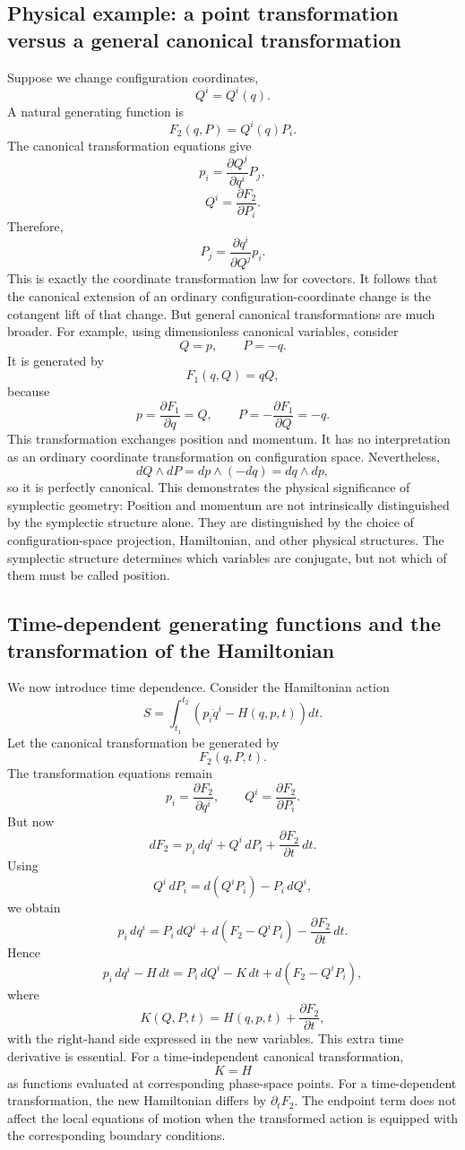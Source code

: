 \subsection{ Physical example: a point transformation versus a general
canonical transformation}
Suppose we change configuration coordinates,
\[
Q^i=Q^i(q).
\]
A natural generating function is
\[
\boxed{F_2(q,P)=Q^i(q)P_i.}
\]
The canonical transformation equations give
\[
p_i=\frac{\partial Q^j}{\partial q^i}P_j,
\]
\[
Q^i=\frac{\partial F_2}{\partial P_i}.
\]
Therefore,
\[
\boxed{
P_j=\frac{\partial q^i}{\partial Q^j}p_i.
}
\]
This is exactly the coordinate transformation law for covectors.
It follows that the canonical extension of an ordinary configuration-coordinate
change is the cotangent lift of that change.
But general canonical transformations are much broader.
For example, using dimensionless canonical variables, consider
\[
\boxed{Q=p,\qquad P=-q.}
\]
It is generated by
\[
F_1(q,Q)=qQ,
\]
because
\[
p=\frac{\partial F_1}{\partial q}=Q,
\qquad
P=-\frac{\partial F_1}{\partial Q}=-q.
\]
This transformation exchanges position and momentum.
It has no interpretation as an ordinary coordinate transformation on
configuration space.
Nevertheless,
\[
dQ\wedge dP=dp\wedge(-dq)=dq\wedge dp,
\]
so it is perfectly canonical.
This demonstrates the physical significance of symplectic geometry:
Position and momentum are not intrinsically distinguished by the symplectic
structure alone. They are distinguished by the choice of configuration-space
projection, Hamiltonian, and other physical structures.
The symplectic structure determines which variables are conjugate, but not
which of them must be called position.

\subsection{Time-dependent generating functions and the transformation of the
Hamiltonian}
We now introduce time dependence.
Consider the Hamiltonian action
\[
S=\int_{t_1}^{t_2}
\left(p_i\dot q^i-H(q,p,t)\right)dt.
\]
Let the canonical transformation be generated by
\[
F_2(q,P,t).
\]
The transformation equations remain
\[
p_i=\frac{\partial F_2}{\partial q^i},
\qquad
Q^i=\frac{\partial F_2}{\partial P_i}.
\]
But now
\[
dF_2
=p_i\,dq^i+Q^i\,dP_i
+\frac{\partial F_2}{\partial t}\,dt.
\]
Using
\[
Q^i\,dP_i=d(Q^iP_i)-P_i\,dQ^i,
\]
we obtain
\[
p_i\,dq^i
=
P_i\,dQ^i
+d(F_2-Q^iP_i)
-\frac{\partial F_2}{\partial t}\,dt.
\]
Hence
\[
p_i\,dq^i-H\,dt
=
P_i\,dQ^i-K\,dt
+d(F_2-Q^iP_i),
\]
where
\[
\boxed{
K(Q,P,t)
=
H(q,p,t)+\frac{\partial F_2}{\partial t},
}
\]
with the right-hand side expressed in the new variables.
This extra time derivative is essential.
For a time-independent canonical transformation,
\[
K=H
\]
as functions evaluated at corresponding phase-space points.
For a time-dependent transformation, the new Hamiltonian differs by \(\partial_tF_2\).
The endpoint term does not affect the local equations of motion when the
transformed action is equipped with the corresponding boundary conditions.

